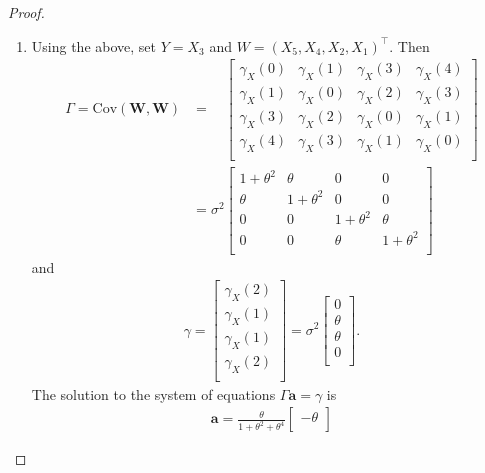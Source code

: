 \documentclass[12pt]{article}
\theoremstyle{definition}
\newcommand{\Co}[2]{\text{Cov}\left({#1}, {#2}\right)}
\newcommand{\vect}[1]{\boldsymbol{#1}}
\begin{document}
\begin{proof}
\begin{enumerate}
    \item Using the above, set $Y = X_3$ and $W = (X_5, X_4, X_2, X_1)^\intercal$. Then
      \begin{align*}
        \Gamma = \Co{\vect{W}}{\vect{W}} &=
        \phantom{\sigma^2}
        \begin{bmatrix}
          \gamma_X(0) & \gamma_X(1) & \gamma_X(3) & \gamma_X(4) \\
          \gamma_X(1) & \gamma_X(0) & \gamma_X(2) & \gamma_X(3) \\
          \gamma_X(3) & \gamma_X(2) & \gamma_X(0) & \gamma_X(1) \\
          \gamma_X(4) & \gamma_X(3) & \gamma_X(1) & \gamma_X(0) \\
        \end{bmatrix}\\
        &=
        \sigma^2
        \begin{bmatrix}
          1 + \theta^2 & \theta & 0 & 0 \\
          \theta & 1 + \theta^2 & 0 & 0 \\
          0 & 0 & 1 + \theta^2 & \theta \\
          0 & 0 & \theta & 1 + \theta^2 \\
        \end{bmatrix}
      \end{align*}
      and
      \begin{align*}
        \gamma =
        \begin{bmatrix}
          \gamma_X(2) \\
          \gamma_X(1) \\
          \gamma_X(1) \\
          \gamma_X(2) \\
        \end{bmatrix}
        = \sigma^2
        \begin{bmatrix}
          0 \\
          \theta \\
          \theta \\
          0 \\
        \end{bmatrix}.
      \end{align*}
      The solution to the system of equations $\Gamma \vect{a} = \gamma$ is
      \begin{align*}
        \vect{a} = \frac{\theta}{1 + \theta^2 + \theta^4}
        \begin{bmatrix}
          -\theta \\

\end{bmatrix}
\end{align*}
\end{enumerate}
\end{proof}
\end{document}
